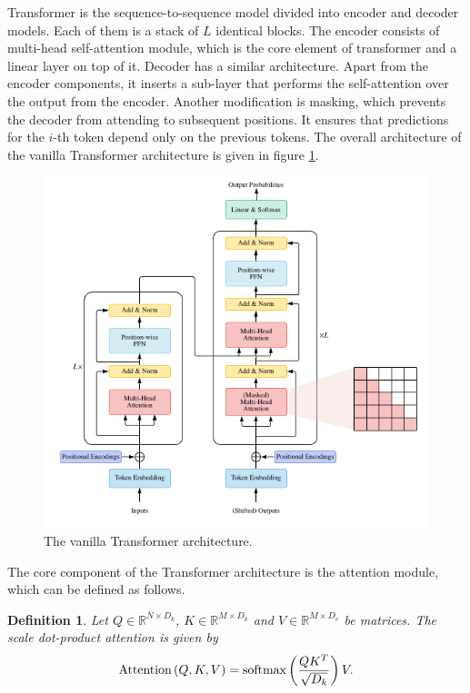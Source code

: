 \documentclass[magisterska,en]{pracamgr}
\newtheorem{defi}{Definition}[section]
\begin{document}
Transformer is the sequence-to-sequence model divided into encoder and decoder models. Each of them is a stack of $L$ identical blocks. The encoder consists of multi-head self-attention module, which is the core element of transformer and a linear layer on top of it. Decoder has a similar architecture. Apart from the encoder components, it inserts a sub-layer that performs the self-attention over the output from the encoder. Another modification is masking, which prevents the decoder from attending to subsequent positions. It ensures that predictions for the $i$-th token depend only on the previous tokens. The overall architecture of the vanilla Transformer architecture is given in figure \ref{attention}.

\begin{figure}[H]
\centering
\includegraphics[scale=0.5]{images/attention.png}
\caption{The vanilla Transformer architecture.}
\label{attention}
\end{figure}


The core component of the Transformer architecture is the attention module, which can be defined as follows.

\begin{defi}\label{attention_def}
    Let $Q \in \mathbb{R}^{N\times D_k}$, $K \in \mathbb{R}^{M\times D_k}$ and $V \in \mathbb{R}^{M\times D_v}$ be matrices. The scale dot-product attention is given by
        \begin{equation*}
        \normalfont
        \textrm{Attention} \left( Q, K, V \right) = \textrm{softmax}\left(\frac{QK^T}{\sqrt{D_k}} \right) V.  
    \end{equation*}

\end{defi}
\end{document}
